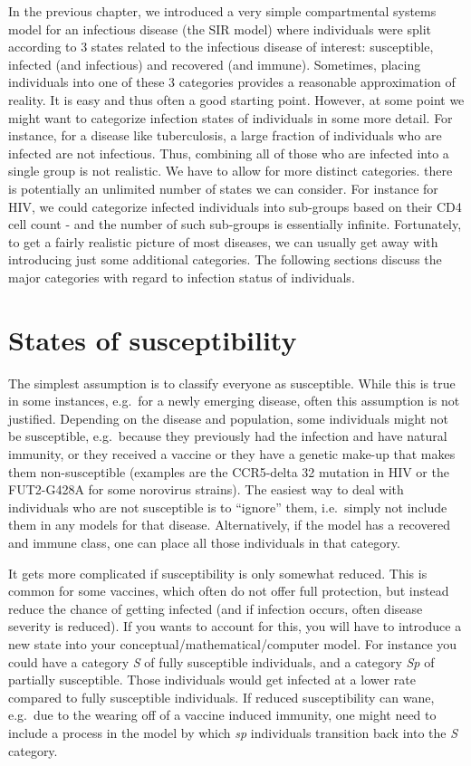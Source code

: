 \documentclass[]{book}
\theoremstyle{definition}
\theoremstyle{definition}
\theoremstyle{definition}
\theoremstyle{remark}
\begin{document}
In the previous chapter, we introduced a very simple compartmental
systems model for an infectious disease (the SIR model) where
individuals were split according to 3 states related to the infectious
disease of interest: susceptible, infected (and infectious) and
recovered (and immune). Sometimes, placing individuals into one of these
3 categories provides a reasonable approximation of reality. It is easy
and thus often a good starting point. However, at some point we might
want to categorize infection states of individuals in some more detail.
For instance, for a disease like tuberculosis, a large fraction of
individuals who are infected are not infectious. Thus, combining all of
those who are infected into a single group is not realistic. We have to
allow for more distinct categories. there is potentially an unlimited
number of states we can consider. For instance for HIV, we could
categorize infected individuals into sub-groups based on their CD4 cell
count - and the number of such sub-groups is essentially infinite.
Fortunately, to get a fairly realistic picture of most diseases, we can
usually get away with introducing just some additional categories. The
following sections discuss the major categories with regard to infection
status of individuals.

\hypertarget{states-of-susceptibility}{%
\section{States of susceptibility}\label{states-of-susceptibility}}

The simplest assumption is to classify everyone as susceptible. While
this is true in some instances, e.g.~for a newly emerging disease, often
this assumption is not justified. Depending on the disease and
population, some individuals might not be susceptible, e.g.~because they
previously had the infection and have natural immunity, or they received
a vaccine or they have a genetic make-up that makes them non-susceptible
(examples are the CCR5-delta 32 mutation in HIV or the FUT2-G428A for
some norovirus strains). The easiest way to deal with individuals who
are not susceptible is to ``ignore'' them, i.e.~simply not include them
in any models for that disease. Alternatively, if the model has a
recovered and immune class, one can place all those individuals in that
category.

It gets more complicated if susceptibility is only somewhat reduced.
This is common for some vaccines, which often do not offer full
protection, but instead reduce the chance of getting infected (and if
infection occurs, often disease severity is reduced). If you wants to
account for this, you will have to introduce a new state into your
conceptual/mathematical/computer model. For instance you could have a
category \emph{S} of fully susceptible individuals, and a category
\emph{Sp} of partially susceptible. Those individuals would get infected
at a lower rate compared to fully susceptible individuals. If reduced
susceptibility can wane, e.g.~due to the wearing off of a vaccine
induced immunity, one might need to include a process in the model by
which \emph{sp} individuals transition back into the \emph{S} category.
\end{document}
